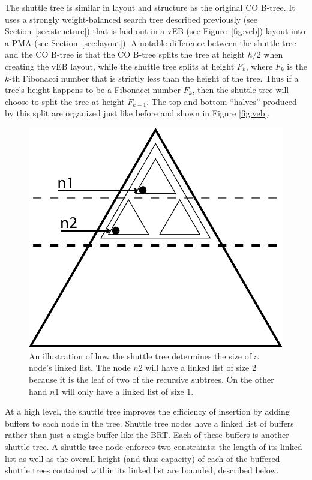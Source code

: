 \documentclass[preprint]{style}
\begin{document}
The shuttle tree is similar in layout and structure as the original CO B-tree.
It uses a strongly weight-balanced search tree described previously (see
Section~\ref{sec:structure}) that is laid out in a vEB (see
Figure~\ref{fig:veb}) layout into a PMA (see Section~\ref{sec:layout}). A
notable difference between the shuttle tree and the CO B-tree is that the CO
B-tree splits the tree at height $h/2$ when creating the vEB layout, while the
shuttle tree splits at height $F_k$, where $F_k$ is the $k$-th Fibonacci number
that is strictly less than the height of the tree. Thus if a tree's height
happens to be a Fibonacci number $F_k$, then the shuttle tree will choose to
split the tree at height $F_{k-1}$. The top and bottom ``halves'' produced by
this split are organized just like before and shown in Figure \ref{fig:veb}.

\begin{figure}
\begin{center}
	\includegraphics[width=0.8\columnwidth]{figures/buffers.pdf}
\end{center}
\caption{An illustration of how the shuttle tree determines the size of a node's linked list. The 
node $n2$ will have a linked list of size 2 because it is the leaf of two of the recursive subtrees. 
On the other hand $n1$ will only have a linked list of size 1.}
\label{fig:buffers}
\end{figure}


At a high level, the shuttle tree improves the efficiency of insertion by
adding buffers to each node in the tree. Shuttle tree nodes have a
linked list of buffers rather than just a single buffer like the BRT. Each of
these buffers is another shuttle tree. A shuttle tree node enforces two
constraints: the length of its linked list as well as the overall height (and
thus capacity) of each of the buffered shuttle trees contained within its
linked list are bounded, described below.
\end{document}
